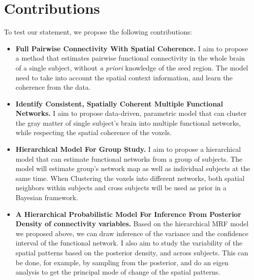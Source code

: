 \documentclass[12pt]{article}
\begin{document}
\section{Contributions}
To test our statement, we propose the following contributions:
\begin{itemize}
  \item \textbf{Full Pairwise Connectivity With Spatial Coherence.} I aim to
    propose a method that estimates pairwise functional connectivity in the
    whole brain of a single subject, without \emph{a priori} knowledge of the
    seed region. The model need to take into account the spatial context
    information, and learn the coherence from the data.

  \item \textbf{Identify Consistent, Spatially Coherent Multiple Functional
    Networks.} I aim to propose data-driven, parametric model that can cluster
    the gray matter of single subject's brain into multiple functional networks,
    while respecting the spatial coherence of the voxels.

  \item \textbf{Hierarchical Model For Group Study.} I aim to propose a
    hierarchical model that can estimate functional networks from a group of
    subjects. The model will estimate group's network map as well as individual
    subjects at the same time. When Clustering the voxels into different
    networks, both spatial neighbors within subjects and cross subjects will be
    used as prior in a Bayesian framework.
  \item \textbf{A Hierarchical Probabilistic Model For Inference From Posterior
    Density of connectivity variables. } Based on the hierarchical MRF model we
    proposed above, we can draw inference of the variance and the confidence
    interval of the functional network. I also aim to study the variability of
    the spatial patterns based on the posterior density, and across
    subjects. This can be done, for example, by sampling from the posterior, and
    do an eigen analysis to get the principal mode of change of the spatial
    patterns.

\end{itemize}
\end{document}
